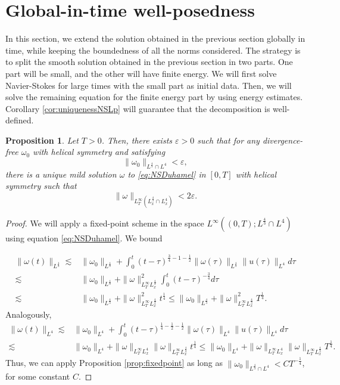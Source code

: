 \documentclass[11pt,a4paper]{article}
\newcommand{\w}{\omega}
\newcommand{\eps}{\varepsilon}
\newtheorem{prop}[thm]{Proposition}
\begin{document}
\section{Global-in-time well-posedness}\label{sec:globalintime}
In this section, we extend the solution obtained in the previous section globally in time, while keeping the boundedness of all the norms considered. The strategy is to split the smooth solution obtained in the previous section in two parts. One part will be small, and the other will have finite energy. We will first solve Navier-Stokes for large times with the small part as initial data. Then, we will solve the remaining equation for the finite energy part by using energy estimates. Corollary \ref{cor:uniquenessNSLp} will guarantee that the decomposition is well-defined.

\begin{prop}\label{prop:longtimesmallpart}
Let $T>0$. Then, there exists $\eps>0$ such that for any divergence-free $\w_0$ with helical symmetry and satisfying
\begin{equation}\label{eq:smallnesscondition}
\|\w_0\|_{L^\frac{4}{3}\cap L^4}<\eps,
\end{equation}
there is a unique mild solution $\w$ to \eqref{eq:NSDuhamel} in $[0,T]$ with helical symmetry such that 
\begin{equation}\label{eq:smallnessproperty}
\|\w \|_{L^\infty_T(L_x^{\frac{4}{3}}\cap L_x^4)}<2\eps.
\end{equation}
\end{prop}
\begin{proof}
We will apply a fixed-point scheme in the space $L^\infty((0,T);L^\frac{4}{3}\cap L^4)$ using equation \eqref{eq:NSDuhamel}. We bound

$$
\begin{aligned}
\|\w(t)\|_{L^{\frac{4}{3}}}
\lesssim & \|\w_0\|_{L^\frac{4}{3}}+\int_0^t (t-\tau)^{\frac{3}{4}-1-\frac{1}{2}}\|\w(\tau)\|_{L^{\frac{4}{3}}}\|u(\tau)\|_{L^4}d\tau\\
\lesssim & \|\w_0\|_{L^\frac{4}{3}}+\|\w\|^2_{L^\infty_TL_x^{\frac{4}{3}}}\int_0^t (t-\tau)^{-\frac{3}{4}}d\tau\\
\lesssim & \|\w_0\|_{L^\frac{4}{3}}+\|\w\|^2_{L^\infty_TL_x^{\frac{4}{3}}} t^{\frac{1}{4}}\leq \|\w_0\|_{L^\frac{4}{3}}+\|\w\|^2_{L^\infty_TL_x^{\frac{4}{3}}} T^{\frac{1}{4}}.
\end{aligned}
$$
Analogously, 
$$
\begin{aligned}
\|\w(t)\|_{L^{4}}
\lesssim & \|\w_0\|_{L^4}+\int_0^t (t-\tau)^{\frac{1}{4}-\frac{1}{2}-\frac{1}{2}}\|\w(\tau)\|_{L^{4}}\|u(\tau)\|_{L^4}d\tau\\
\lesssim & \|\w_0\|_{L^4}+\|\w\|_{L^\infty_TL_x^4}\|\w\|_{L^\infty_TL_x^{\frac43}} t^{\frac{1}{4}}\leq \|\w_0\|_{L^4}+\|\w\|_{L^\infty_TL_x^4}\|\w\|_{L^\infty_TL_x^{\frac{4}{3}}}T^{\frac{1}{4}}.
\end{aligned}
$$
Thus, we can apply Proposition \ref{prop:fixedpoint} as long as $\|\w_0\|_{L^\frac{4}{3}\cap L^4}<CT^{-\frac{1}{4}}$, for some constant $C$.

\end{proof}
\end{document}
